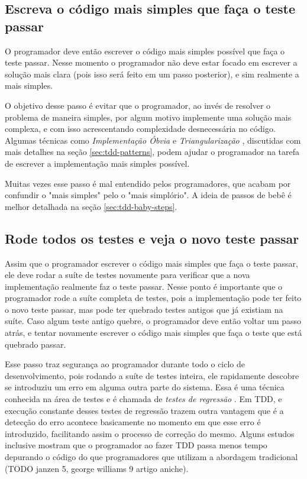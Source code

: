 \subsection{Escreva o código mais simples que faça o teste passar}

O programador deve então escrever o código mais simples possível que faça o teste passar. Nesse momento o programador não deve estar
focado em escrever a solução mais clara (pois isso será feito em um passo posterior), e sim realmente a mais simples.

O objetivo desse passo é evitar que o programador, ao invés de resolver o problema de maneira simples, por algum motivo
implemente uma solução mais complexa, e com isso acrescentando complexidade desnecessária no código. Algumas técnicas como
\textit{Implementação Óbvia} e \textit{Triangularização} \cite{TDDByExample}, discutidas com mais detalhes na seção \ref{sec:tdd-patterns}, 
podem ajudar o programador na tarefa de escrever a implementação mais simples possível.

Muitas vezes esse passo é mal entendido pelos programadores, que acabam por confundir o "mais simples" pelo o "mais simplório". 
A ideia de passos de bebê \cite{TDDByExample} é melhor detalhada na seção \ref{sec:tdd-baby-steps}.

\subsection{Rode todos os testes e veja o novo teste passar}

Assim que o programador escrever o código mais simples que faça o teste passar, ele deve rodar a suíte de testes novamente
para verificar que a nova implementação realmente faz o teste passar. Nesse ponto é importante que o programador rode a suíte 
completa de testes, pois a implementação pode ter feito o novo teste passar, mas pode ter quebrado testes antigos que já existiam na suíte. 
Caso algum teste antigo quebre, o programador deve então voltar um passo atrás, e tentar novamente escrever o código mais simples
que faça o teste que está quebrado passar.

Esse passo traz segurança ao programador durante todo o ciclo de desenvolvimento, pois rodando a suíte de testes inteira, 
ele rapidamente descobre se introduziu um erro em alguma outra parte do sistema. Essa é uma técnica conhecida na área de testes e é
chamada de \textit{testes de regressão} \cite{art-of-sw-testing}. Em TDD, e execução constante desses testes de regressão 
trazem outra vantagem que é a detecção do erro acontece basicamente no momento em que esse erro é introduzido, facilitando assim
o processo de correção do mesmo. Alguns estudos inclusive mostram que o programador ao fazer TDD passa menos tempo depurando o código
do que programadores que utilizam a abordagem tradicional (TODO janzen 5, george williams 9 artigo aniche).

